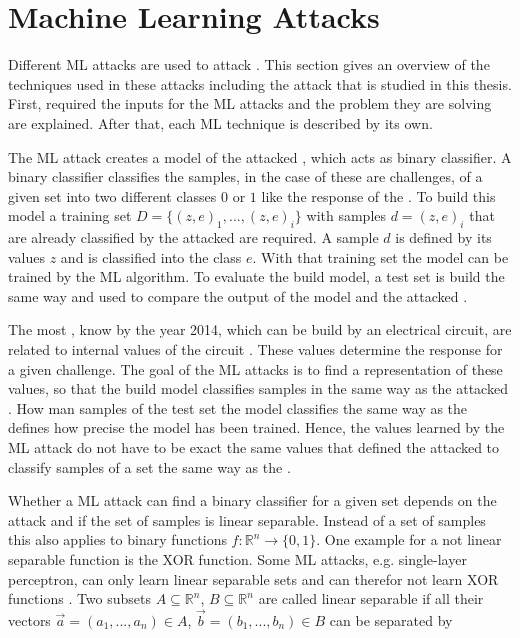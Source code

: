 \chapter{Machine Learning Attacks}
\label{cap:mla}

Different \ac{ML} attacks are used to attack \pufs.
This section gives an overview of the techniques used in these attacks including the attack that is studied in this thesis. %
First, required the inputs for the \ac{ML} attacks and the problem they are solving are explained.
After that, each \ac{ML} technique is described by its own.

The \ac{ML} attack creates a \puf model of the attacked \puf, which acts as binary classifier.
A binary classifier classifies the samples, in the case of \pufs these are challenges, of a given set into two different classes $0$ or $1$ like the response of the \puf. %
To build this model a training set $D = \{(z, e)_1, ..., (z,e)_i\}$ with samples $d = (z, e)_i$ that are already classified by the attacked \puf are required.
A sample $d$ is defined by its values $z$ and is classified into the class $e$. %
With that training set the model can be trained by the \ac{ML} algorithm.
To evaluate the build model, a test set is build the same way and used to compare the output of the \puf model and the attacked \puf.

The most \pufs, know by the year 2014, which can be build by an electrical circuit, are related to internal values of the circuit \cite{Ruhrmair2014PUFOverview}.
These values determine the response for a given challenge. %
The goal of the \ac{ML} attacks is to find a representation of these values, so that the build model classifies samples in the same way as the attacked \puf. %
How man samples of the test set the model classifies the same way as the \puf defines how precise the model has been trained. %
Hence, the values learned by the \ac{ML} attack do not have to be exact the same values that defined the attacked \puf to classify samples of a set the same way as the \puf.

Whether a \ac{ML} attack can find a binary classifier for a given set depends on the attack and if the set of samples is linear separable. 
Instead of a set of samples this also applies to binary functions $f: \mathbb{R}^n \to \{0,1\}$. %
One example for a not linear separable function is the \ac{XOR} function. %
Some \ac{ML} attacks, e.g. single-layer perceptron, can only learn linear separable sets and can therefor not learn \ac{XOR} functions \cite{Minsky1969Perceptrons:Geometry}. %
Two subsets $A \subseteq \mathbb{R}^n$, $B \subseteq \mathbb{R}^n$ are called linear separable if all their vectors $\vec{a} = (a_1, ..., a_n) \in A$, $\vec{b} = (b_1, ..., b_n) \in B$ can be separated by


